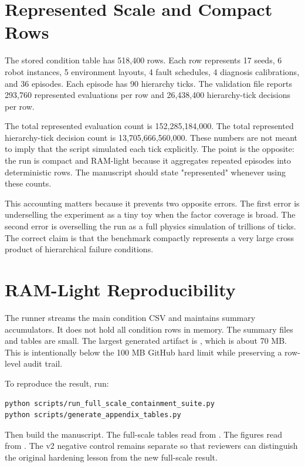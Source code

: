 \section{Represented Scale and Compact Rows}

The stored condition table has 518,400 rows. Each row represents 17 seeds, 6 robot instances, 5 environment layouts, 4 fault schedules, 4 diagnosis calibrations, and 36 episodes. Each episode has 90 hierarchy ticks. The validation file reports 293,760 represented evaluations per row and 26,438,400 hierarchy-tick decisions per row.

The total represented evaluation count is 152,285,184,000. The total represented hierarchy-tick decision count is 13,705,666,560,000. These numbers are not meant to imply that the script simulated each tick explicitly. The point is the opposite: the run is compact and RAM-light because it aggregates repeated episodes into deterministic rows. The manuscript should state "represented" whenever using these counts.

This accounting matters because it prevents two opposite errors. The first error is underselling the experiment as a tiny toy when the factor coverage is broad. The second error is overselling the run as a full physics simulation of trillions of ticks. The correct claim is that the benchmark compactly represents a very large cross product of hierarchical failure conditions.

\section{RAM-Light Reproducibility}

The runner streams the main condition CSV and maintains summary accumulators. It does not hold all condition rows in memory. The summary files and tables are small. The largest generated artifact is , which is about 70 MB. This is intentionally below the 100 MB GitHub hard limit while preserving a row-level audit trail.

To reproduce the result, run:
\begin{verbatim}
python scripts/run_full_scale_containment_suite.py
python scripts/generate_appendix_tables.py
\end{verbatim}
Then build the manuscript. The full-scale tables read from . The figures read from . The v2 negative control remains separate so that reviewers can distinguish the original hardening lesson from the new full-scale result.


